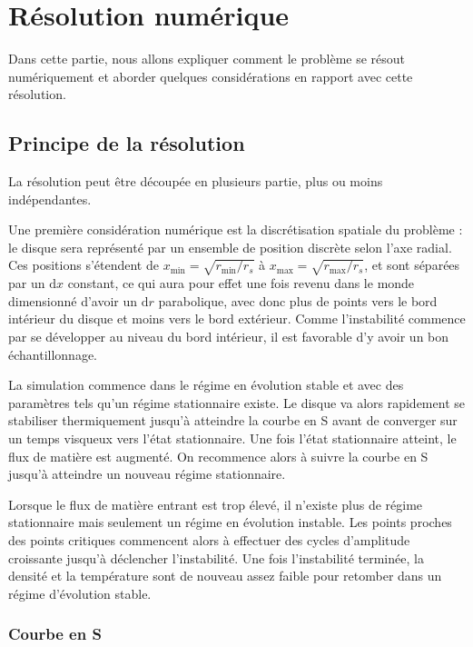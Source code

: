 \section{Résolution numérique}

Dans cette partie, nous allons expliquer comment le problème se résout
numériquement et aborder quelques considérations en rapport avec cette
résolution.

\subsection{Principe de la résolution}
La résolution peut être découpée en plusieurs partie, plus ou moins
indépendantes.

Une première considération numérique est la discrétisation spatiale du problème
: le disque sera représenté par un ensemble de position discrète selon l’axe
radial. Ces positions s’étendent de $x_\textrm{min} = \sqrt{r_\textrm{min}/r_s}$ à $x_\textrm{max} =
\sqrt{r_\textrm{max}/r_s}$, et sont séparées par un $\mathrm{d} x$ constant, ce qui aura pour
effet une fois revenu dans le monde dimensionné d’avoir un $\mathrm{d} r$ parabolique,
avec donc plus de points vers le bord intérieur du disque et moins vers le bord
extérieur. Comme l'instabilité commence par se développer au niveau du bord intérieur, il est favorable d'y avoir un bon échantillonnage.

La simulation commence dans le régime en évolution stable et avec des
paramètres tels qu'un régime stationnaire existe. Le disque va alors rapidement
se stabiliser thermiquement jusqu'à atteindre la courbe en S avant de converger
sur un temps visqueux vers l'état stationnaire. Une fois l'état stationnaire
atteint, le flux de matière est augmenté. On recommence alors à suivre la
courbe en S jusqu'à atteindre un nouveau régime stationnaire.

Lorsque le flux de matière entrant est trop élevé, il n'existe plus de régime
stationnaire mais seulement un régime en évolution instable. Les points proches
des points critiques commencent alors à effectuer des cycles d'amplitude
croissante jusqu'à déclencher l'instabilité. Une fois l'instabilité terminée,
la densité et la température sont de nouveau assez faible pour retomber dans un
régime d'évolution stable.

\subsubsection{Courbe en S}

